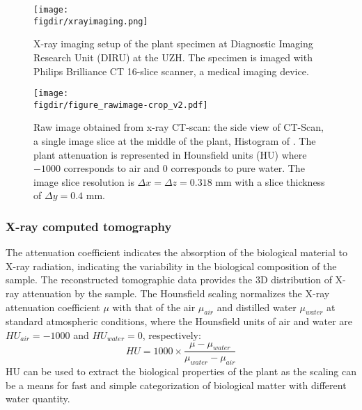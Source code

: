 


\begin{figure}[t]
	\centering
	\texttt{[image: \\figdir/xrayimaging.png]}
	\caption{X-ray imaging setup of the plant specimen at Diagnostic Imaging Research Unit (DIRU) at the UZH. The specimen is imaged with Philips Brilliance CT 16-slice scanner, a medical imaging device.}
	\label{fig:xrayimaging}
\end{figure}

\begin{figure}[t]
	\centering
	\texttt{[image: \\figdir/figure\_rawimage-crop\_v2.pdf]}
	\caption{Raw image obtained from x-ray CT-scan:  the side view of CT-Scan,  a single image slice at the middle of the plant,  Histogram of . The plant attenuation is represented in Hounsfield units (HU) where $-1000$ corresponds to air and $0$ corresponds to pure water. The image slice resolution is $\Delta x = \Delta z=0.318$ mm with a slice thickness of $\Delta y=0.4$ mm.}
	\label{fig:figure_rawimage}
\end{figure}


\subsubsection*{X-ray computed tomography}

The attenuation coefficient indicates the absorption of the biological material to X-ray radiation, indicating the variability in the biological composition of the sample. The reconstructed tomographic data provides the 3D distribution of X-ray attenuation by the sample. The Hounsfield scaling normalizes the X-ray attenuation coefficient $\mu$ with that of the air $\mu_{\textit{air}}$ and distilled water $\mu_{\textit{water}}$ at standard atmospheric conditions, where the Hounsfield units of air and water are $HU_{\textit{air}}=-1000$ and $HU_{\textit{water}}=0$, respectively:
\begin{equation}
HU = 1000 \times \frac{{\mu  - {\mu _{\textit{water}}}}}{{{\mu _{\textit{water}}} - {\mu _{\textit{air}}}}}
\end{equation}
HU can be used to extract the biological properties of the plant as the scaling can be a means for fast and simple categorization of biological matter with different water quantity. 

